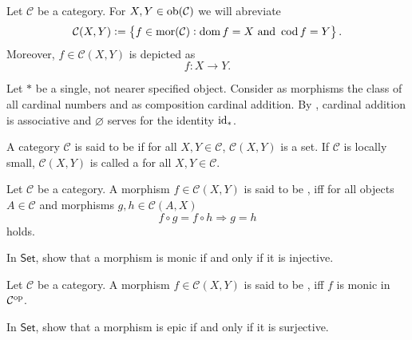 \begin{remark}
	Let $\mathcal{C}$ be a category. For $X,Y \in \operatorname{ob}(\mathcal{C})$ we will abreviate
	\begin{equation*}
		\mathcal{C}(X,Y) := \cbr{f \in \mor(\mathcal{C}) : \dom f = X \text{ and } \cod f = Y}.
	\end{equation*}
	Moreover, $f \in \mathcal{C}(X,Y)$ is depicted as
	\begin{equation}
		f : X \to Y.
	\end{equation}
\end{remark}

\begin{example}
	Let $\ast$ be a single, not nearer specified object. Consider as morphisms the class of all cardinal numbers and as composition cardinal addition. By \cite[112--113]{halbeisen:set_theory:2012}, cardinal addition is associative and $\varnothing$ serves for the identity $\operatorname{id}_\ast$.  
\end{example}

\begin{definition}
	A category $\mathcal{C}$ is said to be  if for all $X,Y \in \mathcal{C}$, $\mathcal{C}(X,Y)$ is a set. If $\mathcal{C}$ is locally small, $\mathcal{C}(X,Y)$ is called a  for all $X,Y \in \mathcal{C}$. 
\end{definition}

\begin{definition}[Monic]
	Let $\mathcal{C}$ be a category. A morphism $f \in \mathcal{C}(X,Y)$ is said to be , iff for all objects $A \in \mathcal{C}$ and morphisms $g,h \in \mathcal{C}(A,X)$
	\begin{equation*}
		f \circ g = f \circ h \Rightarrow g = h
	\end{equation*}
	\noindent holds.
\end{definition}

\begin{exercise}
	In $\mathsf{Set}$, show that a morphism is monic if and only if it is injective.
\end{exercise}

\begin{definition}[Epic]
	Let $\mathcal{C}$ be a category. A morphism $f \in \mathcal{C}(X,Y)$ is said to be , iff $f$ is monic in $\mathcal{C}^{\mathrm{op}}$.
\end{definition}

\begin{exercise}
	In $\mathsf{Set}$, show that a morphism is epic if and only if it is surjective.
\end{exercise}


